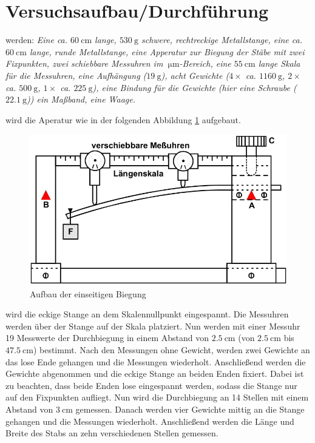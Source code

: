 
\section{Versuchsaufbau/Durchführung}\justifying

\justifying werden: \textit{ Eine ca. $\SI{60}{\centi\meter}$ lange, $\SI{530}{\gram}$ schwere, rechtreckige Metallstange, eine ca. $\SI{60}{\centi\meter}$ lange, runde
Metallstange, eine Apperatur zur Biegung der Stäbe mit zwei Fixpunkten, zwei schiebbare Messuhren im $\SI{}{\micro\meter}$-Bereich, eine
$\SI{55}{\centi\meter}$ lange Skala für die Messuhren, eine Aufhängung ($\SI{19}{\gram}$), acht Gewichte ($4\times$ ca. $\SI{1160}{\gram}$, 
$2\times$ ca. $\SI{500}{\gram}$, $1\times$ ca. $\SI{225}{\gram}$), eine Bindung für die Gewichte (hier eine Schraube ($\SI{22.1}{\gram}$))
ein Maßband, eine Waage.
}

\justifying wird die Aperatur wie in der folgenden Abbildung \ref{fig:aufb} aufgebaut. 

\begin{figure}
    \centering
    \includegraphics[width=0.75\linewidth]{./images/Aufbau_V103.jpg}
    \caption{Aufbau der einseitigen Biegung \cite{V103}}
    \label{fig:aufb}
\end{figure}

\justifying wird die eckige Stange an dem Skalennullpunkt eingespannt. Die Messuhren werden über der Stange auf der Skala platziert. Nun werden mit 
einer Messuhr 19 Messwerte der Durchbiegung in einem Abstand von $\SI{2.5}{\centi\meter}$ (von $\SI{2.5}{\centi\meter}$ bis $\SI{47.5}{\centi\meter}$) 
bestimmt. Nach den Messungen ohne Gewicht, werden zwei Gewichte an das lose Ende gehangen und die Messungen wiederholt. Anschließend
werden die Gewichte abgenommen und die eckige Stange an beiden Enden fixiert. Dabei ist zu beachten, dass beide Enden lose eingespannt werden, sodass die
Stange nur auf den Fixpunkten aufliegt. Nun wird die Durchbiegung an 14 Stellen mit einem Abstand von $\SI{3}{\centi\meter}$ gemessen. Danach werden vier 
Gewichte mittig an die Stange gehangen und die Messungen wiederholt. Anschließend werden die Länge und Breite des Stabs an zehn 
verschiedenen Stellen gemessen.

